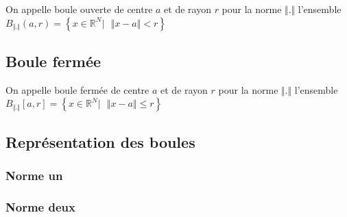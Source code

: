 \documentclass[a4paper,10pt]{article}
\newcommand{\R}{\mathbb{R}}
\newcommand{\tset}[1]{\left\lbrace #1 \right\rbrace}
\begin{document}
On appelle boule ouverte de centre $a$ et de rayon $r$ pour la norme $\Vert . \Vert$ l'ensemble $B_{\Vert . \Vert} \left( a,r \right) = \tset{x \in \R^N \vert \mbox{  } \Vert x - a \Vert < r}$


\subsection{Boule fermée}

On appelle boule fermée de centre $a$ et de rayon $r$ pour la norme $\Vert . \Vert$ l'ensemble $B_{\Vert . \Vert} \left[ a,r \right] = \tset{x \in \R^N \vert \mbox{  } \Vert x - a \Vert \leq r}$

\newpage

\subsection{Représentation des boules}

\subsubsection{Norme un}

\begin{figure}[h]
\end{figure}

\subsubsection{Norme deux}
\end{document}
